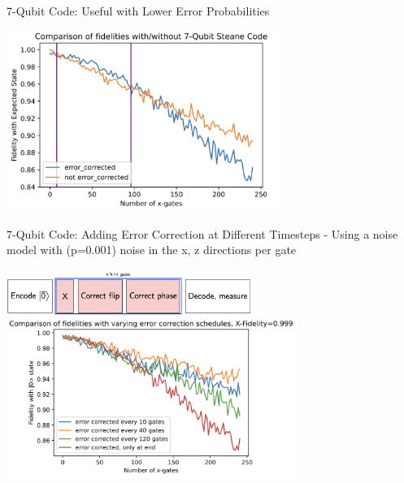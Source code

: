 \documentclass{beamer}
\begin{document}
\begin{frame}{7-Qubit Code: Useful with Lower Error Probabilities}
  \begin{center}
    \includegraphics[width=9cm]{7-steane-comparison}
  \end{center}
\end{frame}

\begin{frame}{7-Qubit Code: Adding Error Correction at Different Timesteps}
  - Using a noise model with (p=0.001) noise in the {x, z} directions per gate 
  \begin{center}
    \includegraphics[width=8cm]{7qb-diagram}
    \includegraphics[width=9.5cm]{7-schedule-comparison.png}
  \end{center}
\end{frame}
\end{document}
